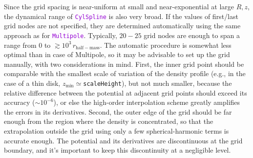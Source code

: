 \documentclass[12pt]{article}
\newcommand{\ttt}[1]{\textcolor{darkviolet}{\texttt{#1}}}
\begin{document}
Since the grid spacing is near-uniform at small and near-exponential at large $R,z$, the dynamical range of \ttt{CylSpline} is also very broad. If the values of first/last grid nodes are not specified, they are determined automatically using the same approach as for \ttt{Multipole}. Typically, $20-25$ grid nodes are enough to span a range from 0 to $\gtrsim 10^3\,r_\mathrm{half-mass}$.
The automatic procedure is somewhat less optimal than in case of Multipole, so it may be advisable to set up the grid manually, with two considerations in mind. First, the inner grid point should be comparable with the smallest scale of variation of the density profile (e.g., in the case of a thin disk, $z_\mathrm{min} \simeq{}$\texttt{scaleHeight}), but not much smaller, because the relative difference between the potential at adjacent grid points should exceed its accuracy ($\sim10^{-6}$), or else the high-order interpolation scheme greatly amplifies the errors in its derivatives. Second, the outer edge of the grid should be far enough from the region where the density is concentrated, so that the extrapolation outside the grid using only a few spherical-harmonic terms is accurate enough. The potential and its derivatives are discontinuous at the grid boundary, and it's important to keep this discontinuity at a negligible level.
\end{document}
